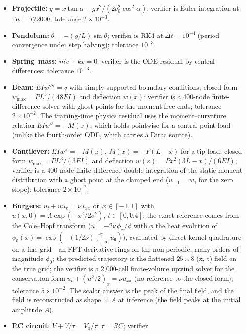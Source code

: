 \documentclass[11pt,a4paper]{article}
\begin{document}
\begin{itemize}[leftmargin=1.6em,itemsep=1pt]
\item \textbf{Projectile:} $y = x\tan\alpha - gx^2/(2v_0^2\cos^2\alpha)$;
      verifier is Euler integration at $\Delta t = T/2000$; tolerance $2\times10^{-3}$.
\item \textbf{Pendulum:} $\ddot\theta = -(g/L)\sin\theta$; verifier is RK4 at
      $\Delta t=10^{-4}$ (period convergence under step halving); tolerance $10^{-3}$.
\item \textbf{Spring--mass:} $m\ddot x + kx = 0$; verifier is the ODE
      residual by central differences; tolerance $10^{-3}$.
\item \textbf{Beam:} $EI w'''' = q$ with simply supported boundary
      conditions; closed form $w_{\max} = PL^3/(48EI)$ and deflection
      $w(x)$; verifier is a 400-node finite-difference solver with ghost
      points for the moment-free ends; tolerance $2\times10^{-2}$. The
      training-time physics residual uses the moment--curvature relation
      $EI w'' = -M(x)$, which holds pointwise for a central point load
      (unlike the fourth-order ODE, which carries a Dirac source).
\item \textbf{Cantilever:} $EI w'' = -M(x)$, $M(x) = -P(L-x)$ for a tip
      load; closed form $w_{\max} = PL^3/(3EI)$ and deflection
      $w(x) = P x^2(3L-x)/(6EI)$; verifier is a 400-node finite-difference
      double integration of the static moment distribution with a ghost
      point at the clamped end ($w_{-1} = w_1$ for the zero slope);
      tolerance $2\times10^{-2}$.
\item \textbf{Burgers:} $u_t + u u_x = \nu u_{xx}$ on $x\in[-1,1]$
      with $u(x,0) = A\exp(-x^2/2\sigma^2)$, $t\in[0,0.4]$; the exact
      reference comes from the Cole--Hopf transform
      ($u = -2\nu\,\phi_x/\phi$ with $\phi$ the heat evolution of
      $\phi_0(x) = \exp(-(1/2\nu)\int_{-\infty}^{x}u_0)$), evaluated by
      direct kernel quadrature on a fine grid---an FFT derivative rings on
      the non-periodic, many-orders-of-magnitude $\phi_0$; the predicted
      trajectory is the flattened $25\times8$ (x, t) field on the true
      grid; the verifier is a 2{,}000-cell finite-volume upwind solver for
      the conservation form $u_t + (u^2/2)_x = \nu u_{xx}$ (no reference
      to the closed form); tolerance $5\times10^{-2}$. The scalar answer is
      the peak of the final field, and the field is reconstructed as
      shape $\times$ $A$ at inference (the field peaks at the initial
      amplitude $A$).
\item \textbf{RC circuit:} $\dot V + V/\tau = V_0/\tau$, $\tau=RC$; verifier

\end{itemize}
\end{document}
